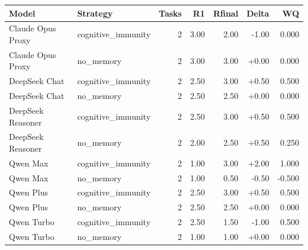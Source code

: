 \begin{tabular}{llrrrrr}
\toprule
Model & Strategy & Tasks & R1 & Rfinal & Delta & WQ \\
\midrule
Claude Opus Proxy & cognitive\_immunity & 2 & 3.00 & 2.00 & -1.00 & 0.000 \\
Claude Opus Proxy & no\_memory & 2 & 3.00 & 3.00 & +0.00 & 0.000 \\
DeepSeek Chat & cognitive\_immunity & 2 & 2.50 & 3.00 & +0.50 & 0.500 \\
DeepSeek Chat & no\_memory & 2 & 2.50 & 2.50 & +0.00 & 0.000 \\
DeepSeek Reasoner & cognitive\_immunity & 2 & 2.50 & 3.00 & +0.50 & 0.500 \\
DeepSeek Reasoner & no\_memory & 2 & 2.00 & 2.50 & +0.50 & 0.250 \\
Qwen Max & cognitive\_immunity & 2 & 1.00 & 3.00 & +2.00 & 1.000 \\
Qwen Max & no\_memory & 2 & 1.00 & 0.50 & -0.50 & -0.500 \\
Qwen Plus & cognitive\_immunity & 2 & 2.50 & 3.00 & +0.50 & 0.500 \\
Qwen Plus & no\_memory & 2 & 2.50 & 2.50 & +0.00 & 0.000 \\
Qwen Turbo & cognitive\_immunity & 2 & 2.50 & 1.50 & -1.00 & 0.500 \\
Qwen Turbo & no\_memory & 2 & 1.00 & 1.00 & +0.00 & 0.000 \\
\bottomrule
\end{tabular}
